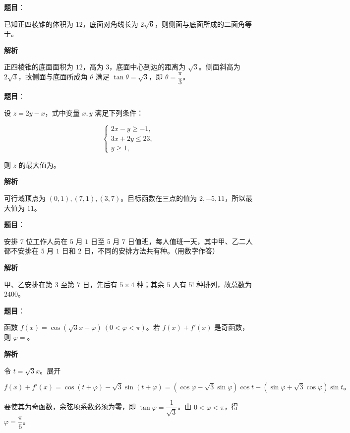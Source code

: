 \begin{answer}

\textbf{题目}：

已知正四棱锥的体积为 $12$，底面对角线长为 $2\sqrt6$，则侧面与底面所成的二面角等于\gkblank{}。

\textbf{解析}

正四棱锥的底面面积为 $12$，高为 $3$，底面中心到边的距离为 $\sqrt3$。侧面斜高为 $2\sqrt3$，故侧面与底面所成角 $\theta$ 满足 $\tan\theta=\sqrt3$，即 $\theta=\dfrac\pi3$。


\end{answer}
\begin{answer}

\textbf{题目}：

设 $z=2y-x$，式中变量 $x,y$ 满足下列条件：

\nopagebreak[4]
\[
\begin{cases}
2x-y\geqslant-1,\\
3x+2y\leqslant23,\\
y\geqslant1,
\end{cases}
\]

则 $z$ 的最大值为\gkblank{}。

\textbf{解析}

可行域顶点为 $(0,1),(7,1),(3,7)$。目标函数在三点的值为 $2,-5,11$，所以最大值为 $11$。


\end{answer}
\begin{answer}

\textbf{题目}：

安排 $7$ 位工作人员在 $5$ 月 $1$ 日至 $5$ 月 $7$ 日值班，每人值班一天，其中甲、乙二人都不安排在 $5$ 月 $1$ 日和 $2$ 日，不同的安排方法共有\gkblank{}种。（用数字作答）

\textbf{解析}

甲、乙安排在第 $3$ 至第 $7$ 日，先后有 $5\times4$ 种；其余 $5$ 人有 $5!$ 种排列，故总数为 $2400$。


\end{answer}
\begin{answer}

\textbf{题目}：

函数 $f(x)=\cos(\sqrt3x+\varphi)\ (0<\varphi<\pi)$。若 $f(x)+f'(x)$ 是奇函数，则 $\varphi=$\gkblank{}。

\textbf{解析}

令 $t=\sqrt3x$。展开

\nopagebreak[4]
\[
f(x)+f'(x)=\cos(t+\varphi)-\sqrt3\sin(t+\varphi)
=(\cos\varphi-\sqrt3\sin\varphi)\cos t
-(\sin\varphi+\sqrt3\cos\varphi)\sin t\text{。}
\]

要使其为奇函数，余弦项系数必须为零，即 $\tan\varphi=\dfrac1{\sqrt3}$。由 $0<\varphi<\pi$，得 $\varphi=\dfrac\pi6$。


\end{answer}
